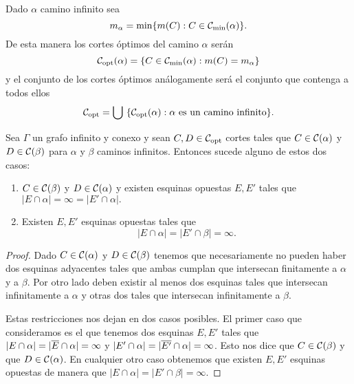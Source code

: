 \documentclass[tesis.tex]{subfiles}
\begin{document}

\begin{deff}
	Dado $\alpha$ camino infinito sea
	\[
		m_\alpha = \min \{ m(C) : C \in {\cal C}_{\text{min}}(\alpha) \}.
	\]
	De esta manera los cortes óptimos del camino $\alpha$ serán
	\[
		{\cal C}_{\text{opt}}(\alpha) = \{ C \in {\cal C}_{\text{min}}(\alpha) : m(C) = m_\alpha  \}
	\]
	y el conjunto de los cortes óptimos análogamente será el conjunto que contenga a todos ellos
	\[
		{\cal C}_{\text{opt}} = \bigcup \ \{ {\cal C}_{\text{opt}}(\alpha) : \alpha \ \text{es un camino infinito}  \}.
	\]
\end{deff}

\begin{lema}\label{lema_esquinas_caminos}
	
	Sea $\Gamma$ un grafo infinito y conexo y sean $C,D \in {\cal C}_{\text{opt}}$ cortes tales que $C \in {\cal C}(\alpha)$ y $D \in {\cal C}(\beta)$ para $\alpha$ y $\beta$ caminos infinitos.
	Entonces sucede alguno de estos dos casos:
	\begin{enumerate}
		\item $C \in {\cal C}(\beta)$ y $D \in {\cal C}(\alpha)$ y existen esquinas opuestas $E, E'$ tales que $|E \cap \alpha| = \infty = |E' \cap \alpha|.$
		
		\item Existen $E, E'$ esquinas opuestas tales que
		\[
		|E \cap \alpha| = |E' \cap \beta | = \infty. 
		\]
		
	\end{enumerate}
\end{lema}
\begin{proof}
	Dado $C \in {\cal C}(\alpha)$ y $D \in {\cal C}(\beta)$ tenemos que necesariamente no pueden haber dos esquinas adyacentes tales que ambas cumplan que intersecan finitamente a $\alpha$ y a $\beta$.
	Por otro lado deben existir al menos dos esquinas tales que intersecan infinitamente a $\alpha$ y otras dos tales que intersecan infinitamente a $\beta$. 
	
	Estas restricciones nos dejan en dos casos posibles.
	El primer caso que consideramos es el que tenemos dos esquinas $E, E'$ tales que $|E \cap \alpha| = |\overline{E} \cap \alpha| = \infty$ y $|E' \cap \alpha| = |\overline{E'} \cap \alpha|=\infty$.
	Esto nos dice que $C \in {\cal C}(\beta)$ y que $D \in {\cal C}(\alpha)$.
	En cualquier otro caso obtenemos que existen $E,E'$ esquinas opuestas de manera que $|E \cap \alpha| = |E' \cap \beta | = \infty$.
	
\end{proof}
\end{document}
